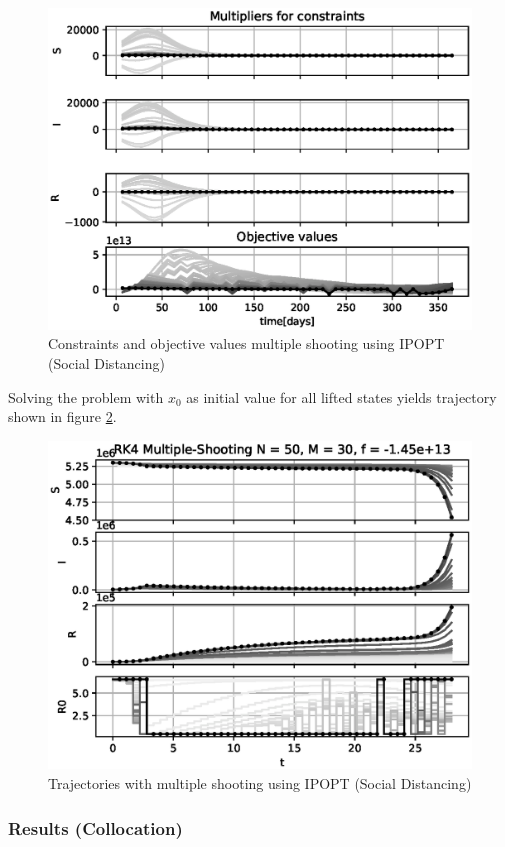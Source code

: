 \begin{figure}[H]
    \centering
    \includegraphics[width=.8\textwidth]{pythonProject/Figures/Multiple_Shooting_obj_con_IPOPT_traj_initial_Social_Distancing.eps}
    \caption{Constraints and objective values multiple shooting using IPOPT (Social Distancing)}
    \label{fig:MS_Cons_Obj_IPOPT}
\end{figure}

Solving the problem with $x_0$ as initial value for all lifted states yields trajectory shown in figure \ref{fig:MS_Traj_IPOPT}.

\begin{figure}[H]
    \centering
    \includegraphics[width=.8\textwidth]{pythonProject/Figures/Multiple_Shooting_Trajectory_IPOPT.eps}
    \caption{Trajectories with multiple shooting using IPOPT (Social Distancing)}
    \label{fig:MS_Traj_IPOPT}
\end{figure}

\subsubsection{Results (Collocation)}



